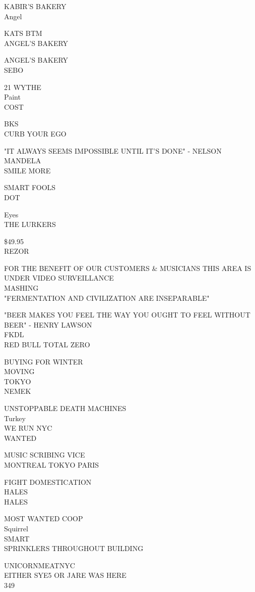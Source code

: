 \documentclass[10pt,letterpaper]{article}
\begin{document}
KABIR'S BAKERY\\
Angel

KATS BTM\\
ANGEL'S BAKERY

ANGEL'S BAKERY\\
SEBO

21 WYTHE\\
Paint\\
COST

BKS\\
CURB YOUR EGO

"IT ALWAYS SEEMS IMPOSSIBLE UNTIL IT'S DONE" {-} NELSON MANDELA\\
SMILE MORE

SMART FOOLS\\
DOT

Eyes\\
THE LURKERS

\$49.95\\
REZOR

FOR THE BENEFIT OF OUR CUSTOMERS \& MUSICIANS THIS AREA IS UNDER VIDEO SURVEILLANCE\\
MASHING\\
"FERMENTATION AND CIVILIZATION ARE INSEPARABLE"

"BEER MAKES YOU FEEL THE WAY YOU OUGHT TO FEEL WITHOUT BEER" {-} HENRY LAWSON\\
FKDL\\
RED BULL TOTAL ZERO

BUYING FOR WINTER\\
MOVING\\
TOKYO\\
NEMEK

UNSTOPPABLE DEATH MACHINES\\
Turkey\\
WE RUN NYC\\
WANTED

MUSIC SCRIBING VICE\\
MONTREAL TOKYO PARIS

FIGHT DOMESTICATION\\
HALES\\
HALES

MOST WANTED COOP\\
Squirrel\\
SMART\\
SPRINKLERS THROUGHOUT BUILDING

UNICORNMEATNYC\\
EITHER SYE5 OR JARE WAS HERE\\
349
\end{document}
